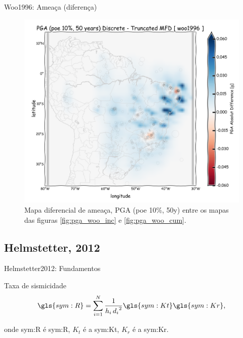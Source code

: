 \documentclass[ucs,8pt]{beamer}
\begin{document}
\begin{frame}{Woo1996: Ameaça (diferença)}
\begin{figure}[H]
	\centering
		\includegraphics[height=0.95\textheight]{pga_woo_dif} 
		\caption{Mapa diferencial de ameaça, PGA (poe 10\%, 50y)
		   entre os mapas das figuras 
		   \ref{fig:pga_woo_inc} e \ref{fig:pga_woo_cum}.}
		\label{fig:pga_woo_dif} 
\end{figure}
\end{frame}



\subsection{Helmstetter, 2012}

\begin{frame}{Helmstetter2012: Fundamentos}
	\begin{block}{Taxa de sismicidade}
		\begin{equation}
			\ensuremath{\gls{sym:R} = \sum_{i=1}^{N}{ \frac{1}{h_i\,{d_i}^2} \gls{sym:Kt}\gls{sym:Kr} }},
			\label{eq:helms01}
		\end{equation}
	\end{block}
	onde \gls{sym:R} é \glsdesc{sym:R}, 
		  $K_t$ é a \glsdesc{sym:Kt}, 
		  $K_r$ é a \glsdesc{sym:Kr}.
\end{frame}
\end{document}

